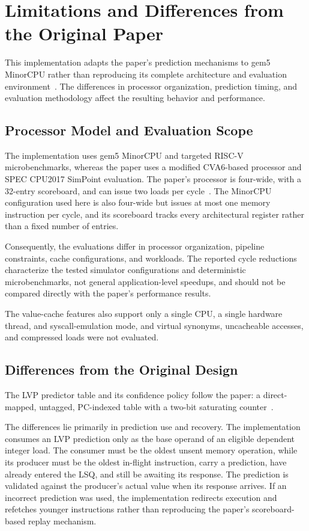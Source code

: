 \section{Limitations and Differences from the Original Paper}

This implementation adapts the paper's prediction mechanisms to
gem5 MinorCPU rather than reproducing its complete architecture
and evaluation environment~\cite{ravenel2025architecting}. The
differences in processor organization, prediction timing, and
evaluation methodology affect the resulting behavior and
performance.

\subsection{Processor Model and Evaluation Scope}

The implementation uses gem5 MinorCPU and targeted RISC-V
microbenchmarks, whereas the paper uses a modified CVA6-based
processor and SPEC CPU2017 SimPoint evaluation. The paper's
processor is four-wide, with a 32-entry scoreboard, and can issue two
loads per cycle~\cite{ravenel2025architecting}. The MinorCPU
configuration used here is also four-wide but issues at most one memory
instruction per cycle, and its scoreboard tracks every architectural
register rather than a fixed number of entries.

Consequently, the evaluations differ in processor organization,
pipeline constraints, cache configurations, and workloads. The
reported cycle reductions characterize the tested simulator
configurations and deterministic microbenchmarks, not general
application-level speedups, and should not be compared directly
with the paper's performance results.

The value-cache features also support only a single CPU, a single
hardware thread, and syscall-emulation mode, and virtual synonyms,
uncacheable accesses, and compressed loads were not evaluated.

\subsection{Differences from the Original Design}

The LVP predictor table and its confidence policy follow the paper: a
direct-mapped, untagged, PC-indexed table with a two-bit saturating
counter~\cite{ravenel2025architecting}.

The differences lie primarily in prediction use and recovery. The
implementation consumes an LVP prediction only as the base operand of
an eligible dependent integer load. The consumer must be the oldest
unsent memory operation, while its producer must be the oldest
in-flight instruction, carry a prediction, have already entered the
LSQ, and still be awaiting its response. The prediction is validated against the producer's
actual value when its response arrives. If an incorrect prediction was
used, the implementation redirects execution and refetches younger
instructions rather than reproducing the paper's scoreboard-based
replay mechanism.

